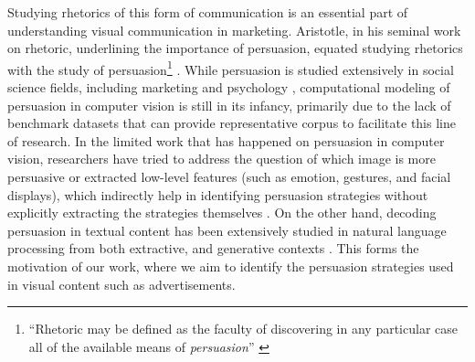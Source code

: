 \documentclass[hidelinks,11pt,a4paper]{report}
\renewcommand{\cite}[1]{\citep{#1}}
\begin{document}
Studying rhetorics of this form of communication is an essential part of understanding visual communication in marketing. Aristotle, in his seminal work on rhetoric, underlining the importance of persuasion, equated studying rhetorics with the study of persuasion\footnote{``Rhetoric may be defined as the faculty of discovering in any particular case all of the available means of \textit{persuasion}'' \cite{rapp2002aristotle}} \cite{rapp2002aristotle}. While persuasion is studied extensively in social science fields, including marketing \cite{meyers1999consumers,keller2003affect} and psychology \cite{hovland1953communication,petty1986elaboration}, computational modeling of persuasion in computer vision is still in its infancy, primarily due to the lack of benchmark datasets that can provide representative corpus to facilitate this line of research. In the limited work that has happened on persuasion in computer vision, researchers have tried to address the question of which image is more persuasive \cite{bai2021m2p2} or extracted low-level features (such as emotion, gestures, and facial displays), which indirectly help in identifying persuasion strategies without explicitly extracting the strategies themselves \cite{joo2014visual}. On the other hand, decoding persuasion in textual content has been extensively studied in natural language processing from both extractive, and generative contexts \cite{habernal2016makes,ChenYang2021,luu2019measuring}. This forms the motivation of our work, where we aim to identify the persuasion strategies used in visual content such as advertisements.




\end{document}
